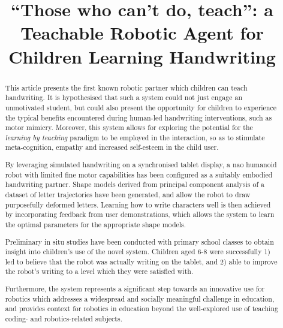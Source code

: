 \documentclass{sig-alternate}
\title{\LARGE \bf
``Those who can't do, teach'': a Teachable Robotic Agent for Children Learning Handwriting
}
\begin{document}
\maketitle

\begin{abstract}
%
%





This article presents the first known robotic partner which children can teach handwriting. It is
hypothesised that such a system could not just engage an unmotivated student,
but could also present the opportunity for children to experience the typical
benefits encountered during human-led handwriting interventions, such as motor
mimicry. Moreover, this system allows for exploring the potential for the
\emph{learning by teaching} paradigm to be employed in the interaction, so as to
stimulate meta-cognition, empathy and increased self-esteem in the child user. 

By leveraging simulated handwriting on a synchronised tablet display, a {\sc nao}
humanoid robot with limited fine motor capabilities has been configured as a
suitably embodied handwriting partner. Shape models derived from principal
component analysis of a dataset of letter trajectories have been generated, and allow
the robot to draw purposefully deformed letters. Learning how to write
characters well is then achieved by incorporating feedback from user
demonstrations, which allows the system to learn the optimal parameters for the
appropriate shape models. 

Preliminary in situ studies have been conducted with primary school classes to obtain
insight into children's use of the novel system. 
Children aged 6-8 were successfully 1) led to believe that the robot was
actually writing on the tablet, and 2) able to improve the robot's writing to a
level which they were satisfied with. 

Furthermore, the system represents a
significant step towards an innovative use for robotics which addresses a
widespread and socially meaningful challenge in education, and provides context
for robotics in education beyond the well-explored use of teaching coding- and
robotics-related subjects.

\end{abstract}
\end{document}
